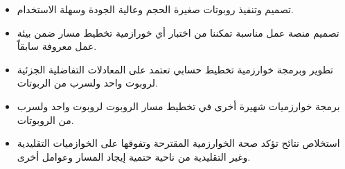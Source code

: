 \begin{itemize}
	\item تصميم وتنفيذ روبوتات صغيرة الحجم وعالية الجودة وسهلة الاستخدام.
	\item تصميم منصة عمل مناسبة تمكننا من اختبار أي خورازمية تخطيط مسار ضمن بيئة عمل معروفة سابقاّ.
	\item تطوير وبرمجة خوارزمية تخطيط حسابي تعتمد على المعادلات التفاضلية الجزئية لروبوت واحد ولسرب من الربوتات.
	\item  برمجة خوارزميات شهيرة أخرى في تخطيط مسار الروبوت لروبوت واحد ولسرب من الروبوتات.
	\item استخلاص نتائح تؤكد صحة الخوارزمية المقترحة وتفوقها على الخوازميات التقليدية وغير التقليدية من ناحية حتمية إيجاد المسار وعوامل أخرى.
\end{itemize}
